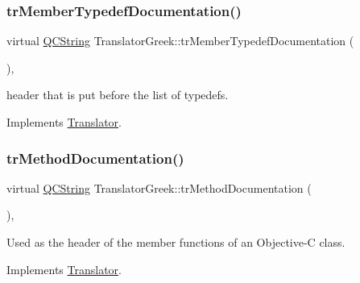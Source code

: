 \mbox{\label{class_translator_greek_a9933756c915b042df0a1f56acb61ee4a}} 
\subsubsection{\texorpdfstring{trMemberTypedefDocumentation()}{trMemberTypedefDocumentation()}}
{\footnotesize\ttfamily virtual \mbox{\hyperlink{class_q_c_string}{Q\+C\+String}} Translator\+Greek\+::tr\+Member\+Typedef\+Documentation (\begin{DoxyParamCaption}{ }\end{DoxyParamCaption})\hspace{0.3cm}{\ttfamily [inline]}, {\ttfamily [virtual]}}

header that is put before the list of typedefs. 

Implements \mbox{\hyperlink{class_translator}{Translator}}.

\mbox{\label{class_translator_greek_a4360800445c3e95505325fcd92a08ac4}} 
\subsubsection{\texorpdfstring{trMethodDocumentation()}{trMethodDocumentation()}}
{\footnotesize\ttfamily virtual \mbox{\hyperlink{class_q_c_string}{Q\+C\+String}} Translator\+Greek\+::tr\+Method\+Documentation (\begin{DoxyParamCaption}{ }\end{DoxyParamCaption})\hspace{0.3cm}{\ttfamily [inline]}, {\ttfamily [virtual]}}

Used as the header of the member functions of an Objective-\/C class. 

Implements \mbox{\hyperlink{class_translator}{Translator}}.

\mbox{\label{class_translator_greek_a10bca707981aa855996bab1d0748d6c4}} 

